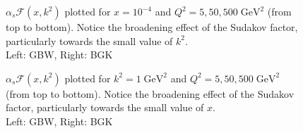 \documentclass[11pt]{article}
\begin{document}
\begin{figure}[H]
\caption{$\alpha_s\mathcal{F}(x,k^2)$ plotted for $x=10^{-4}$ and $Q^2=5, 50 , 500\; \mathrm{GeV^2}$ (from top to bottom). Notice the broadening effect of the Sudakov factor, particularly towards the small value of $k^2$.\\Left: GBW, Right: BGK}
\label{fig:gluon}
\end{figure}
\begin{figure}[H]
\caption{$\alpha_s\mathcal{F}(x,k^2)$ plotted for $k^2=1\;\mathrm{GeV^2}$ and $Q^2=5, 50 , 500\; \mathrm{GeV^2}$ (from top to bottom). Notice the broadening effect of the Sudakov factor, particularly towards the small value of $x$.\\Left: GBW, Right: BGK}
\label{fig:gluon-x}
\end{figure}
\end{document}
